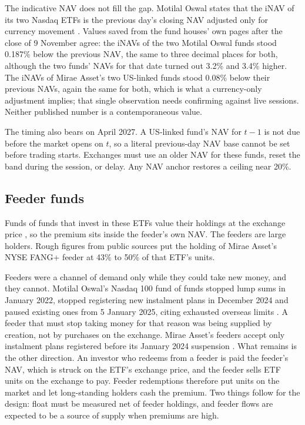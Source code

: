 \documentclass[11pt,a4paper]{article}
\theoremstyle{definition}
\begin{document}
The indicative NAV does not fill the gap. Motilal Oswal states that the iNAV of its two Nasdaq ETFs is the previous day's closing NAV adjusted only for currency movement \citep{motilal2026inav}. Values saved from the fund houses' own pages after the close of 9 November agree: the iNAVs of the two Motilal Oswal funds stood 0.187\% below the previous NAV, the same to three decimal places for both, although the two funds' NAVs for that date turned out 3.2\% and 3.4\% higher. The iNAVs of Mirae Asset's two US-linked funds stood 0.08\% below their previous NAVs, again the same for both, which is what a currency-only adjustment implies; that single observation needs confirming against live sessions. Neither published number is a contemporaneous value.

The timing also bears on April 2027. A US-linked fund's NAV for $t-1$ is not due before the market opens on $t$, so a literal previous-day NAV base cannot be set before trading starts. Exchanges must use an older NAV for these funds, reset the band during the session, or delay. Any NAV anchor restores a ceiling near 20\%.

\subsection{Feeder funds}
Funds of funds that invest in these ETFs value their holdings at the exchange price \citep{vr2026fof}, so the premium sits inside the feeder's own NAV. The feeders are large holders. Rough figures from public sources put the holding of Mirae Asset's NYSE FANG+ feeder at 43\% to 50\% of that ETF's units.

Feeders were a channel of demand only while they could take new money, and they cannot. Motilal Oswal's Nasdaq 100 fund of funds stopped lump sums in January 2022, stopped registering new instalment plans in December 2024 and paused existing ones from 5 January 2025, citing exhausted overseas limits \citep{et2025motilal}. A feeder that must stop taking money for that reason was being supplied by creation, not by purchases on the exchange. Mirae Asset's feeders accept only instalment plans registered before its January 2024 suspension \citep{mirae2024addendum}. What remains is the other direction. An investor who redeems from a feeder is paid the feeder's NAV, which is struck on the ETF's exchange price, and the feeder sells ETF units on the exchange to pay. Feeder redemptions therefore put units on the market and let long-standing holders cash the premium. Two things follow for the design: float must be measured net of feeder holdings, and feeder flows are expected to be a source of supply when premiums are high.
\end{document}
